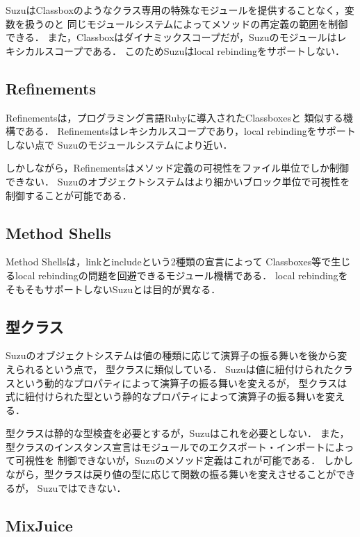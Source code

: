 \documentclass{ipsjprosym}
\begin{document}
SuzuはClassboxのようなクラス専用の特殊なモジュールを提供することなく，変数を扱うのと
同じモジュールシステムによってメソッドの再定義の範囲を制御できる．
また，Classboxはダイナミックスコープだが，Suzuのモジュールはレキシカルスコープである．
このためSuzuはlocal rebindingをサポートしない．

\subsection{Refinements}

Refinements\cite{Maeda:2013}は，プログラミング言語Rubyに導入されたClassboxesと
類似する機構である．
Refinementsはレキシカルスコープであり，local rebindingをサポートしない点で
Suzuのモジュールシステムにより近い．

しかしながら，Refinementsはメソッド定義の可視性をファイル単位でしか制御できない．
Suzuのオブジェクトシステムはより細かいブロック単位で可視性を制御することが可能である．

\subsection{Method Shells}

Method Shells\cite{Takeshita:2014-07-14}は，linkとincludeという2種類の宣言によって
Classboxes等で生じるlocal rebindingの問題を回避できるモジュール機構である．
local rebindingをそもそもサポートしないSuzuとは目的が異なる．

\subsection{型クラス}

Suzuのオブジェクトシステムは値の種類に応じて演算子の振る舞いを後から変えられるという点で，
型クラス\cite{Wadler:1989:MAP:75277.75283}に類似している．
Suzuは値に紐付けられたクラスという動的なプロパティによって演算子の振る舞いを変えるが，
型クラスは式に紐付けられた型という静的なプロパティによって演算子の振る舞いを変える．

型クラスは静的な型検査を必要とするが，Suzuはこれを必要としない．
また，型クラスのインスタンス宣言はモジュールでのエクスポート・インポートによって可視性を
制御できないが，Suzuのメソッド定義はこれが可能である．
しかしながら，型クラスは戻り値の型に応じて関数の振る舞いを変えさせることができるが，
Suzuではできない．

\subsection{MixJuice}
\end{document}
